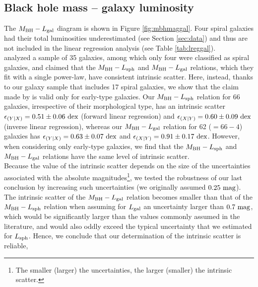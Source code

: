 \documentclass[preprint2]{emulateapj}
\begin{document}
\subsection{Black hole mass -- galaxy luminosity}
The $M_{\rm BH} - L_{\rm gal}$ diagram is shown in Figure \ref{fig:mbhmaggal}.
Four spiral galaxies had their total luminosities underestimated (see Section \ref{sec:data}) 
and thus are not included in the linear regression analysis (see Table \ref{tab:lreggal}). \\
\cite{lasker2014anal} analyzed a sample of 35 galaxies, among which only four were classified as spiral galaxies, 
and claimed that the $M_{\rm BH} - L_{\rm sph}$ and $M_{\rm BH} - L_{\rm gal}$ relations, 
which they fit with a single power-law, have consistent intrinsic scatter.
Here, instead, thanks to our galaxy sample that includes 17 spiral galaxies, 
we show that the claim made by \cite{lasker2014anal} is valid only for early-type galaxies. 
Our $M_{\rm BH} - L_{\rm sph}$ relation for 66 galaxies, irrespective of their morphological type, 
has an intrinsic scatter $\epsilon_{(Y|X)} = 0.51 \pm 0.06\rm~dex$ (forward linear regression) 
and $\epsilon_{(X|Y)} = 0.60 \pm 0.09\rm~dex$ (inverse linear regression), 
whereas our $M_{\rm BH} - L_{\rm gal}$ relation for 62 ($=66-4$) galaxies has $\epsilon_{(Y|X)} = 0.63 \pm 0.07\rm~dex$ 
and $\epsilon_{(X|Y)} = 0.91 \pm 0.17\rm~dex$.
However, when considering only early-type galaxies, 
we find that the $M_{\rm BH} - L_{\rm sph}$ and $M_{\rm BH} - L_{\rm gal}$ relations have the same level of intrinsic scatter. \\
Because the value of the intrinsic scatter depends on the size of the uncertainties associated with the absolute magnitudes\footnote{The 
smaller (larger) the uncertainties, the larger (smaller) the intrinsic scatter.}, 
we tested the robustness of our last conclusion by increasing such uncertainties  
(we originally assumed $0.25\rm~mag$).
The intrinsic scatter of the $M_{\rm BH} - L_{\rm gal}$ relation becomes smaller than that of the $M_{\rm BH} - L_{\rm sph}$ relation 
when assuming for $L_{\rm gal}$ an uncertainty larger than $0.7\rm~mag$, 
which would be significantly larger than the values commonly assumed in the literature, 
and would also oddly exceed the typical uncertainty that we estimated for $L_{\rm sph}$. 
Hence, we conclude that our determination of the intrinsic scatter is reliable, 
\end{document}
